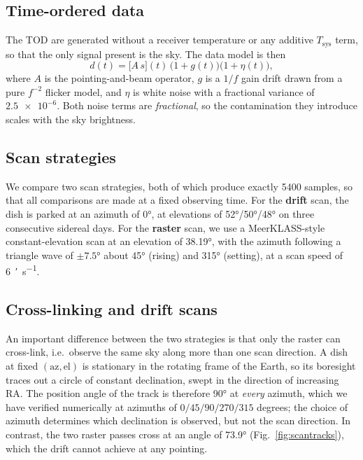 \documentclass[a4paper,fleqn,usenatbib]{mnras}
\begin{document}
\subsection{Time-ordered data}
The TOD are generated without a receiver temperature or any additive
$T_{\mathrm{sys}}$ term, so that the only signal present is the sky. The data
model is then
\begin{equation}
  d(t) = \bigl[ A\,s \bigr](t)\,\bigl(1 + g(t)\bigr)\bigl(1 + \eta(t)\bigr),
  \label{eq:tod}
\end{equation}
where $A$ is the pointing-and-beam operator, $g$ is a $1/f$ gain drift drawn
from a pure $f^{-2}$ flicker model, and $\eta$ is white noise with a fractional
variance of $\num{2.5e-6}$. Both noise terms are \emph{fractional}, so the
contamination they introduce scales with the sky brightness.

\subsection{Scan strategies}
\label{sec:strategies}
We compare two scan strategies, both of which produce exactly 5400 samples, so
that all comparisons are made at a fixed observing time. For the
\textbf{drift} scan, the dish is parked at an azimuth of \ang{0}, at elevations
of \ang{52}/\ang{50}/\ang{48} on three consecutive sidereal days. For the
\textbf{raster} scan, we use a MeerKLASS-style constant-elevation scan at an
elevation of \ang{38.19}, with the azimuth following a triangle wave of
$\pm\ang{7.5}$ about \ang{45} (rising) and \ang{315} (setting), at a scan speed
of \SI{6}{\arcminute\per\second}.

\subsection{Cross-linking and drift scans}
\label{sec:crosslink}
An important difference between the two strategies is that only the raster
can cross-link, i.e.\ observe the same sky along more than one scan direction.
A dish at fixed $(\mathrm{az}, \mathrm{el})$ is stationary in the rotating
frame of the Earth, so its boresight traces out a circle of constant
declination, swept in the direction of increasing RA. The position angle of
the track is therefore \ang{90} at \emph{every} azimuth, which we have verified
numerically at azimuths of $0/45/90/270/315$ degrees; the choice of azimuth
determines which declination is observed, but not the scan direction. In
contrast, the two raster passes cross at an angle of \ang{73.9}
(Fig.~\ref{fig:scantracks}), which the drift cannot achieve at any pointing.
\end{document}
